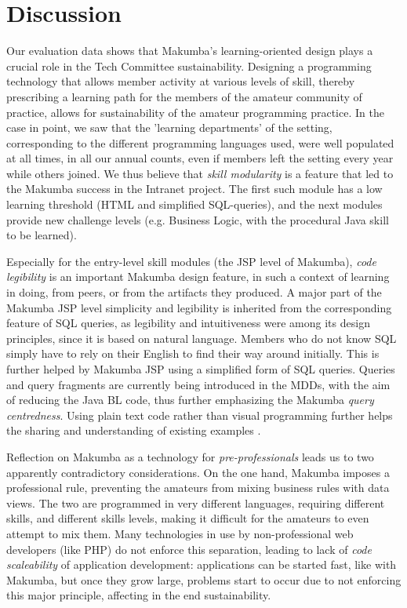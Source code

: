 \documentclass{llncs}
\begin{document}
\section{Discussion}\label{sec:disco}
Our evaluation data shows that Makumba's learning-oriented design  plays a crucial role in the Tech Committee sustainability. Designing a programming technology that allows member activity at various levels of skill, thereby prescribing a learning path for the members of the amateur community of practice, allows for sustainability of the amateur programming practice. In the case in point, we saw that the 'learning departments' of the setting, corresponding to the different programming languages used, were well populated at all times, in all our annual counts,  even if members left the setting every year while others joined. We thus believe that \textit{skill modularity} is a feature that led to the Makumba success in the Intranet project. The first such module has a low learning threshold (HTML and simplified SQL-queries), and the next modules provide new challenge levels (e.g. Business Logic, with the procedural Java skill to be learned).

Especially for the entry-level skill modules (the JSP level of Makumba), \textit{code legibility} is an important Makumba design feature, in such a context of learning in doing, from peers, or from the artifacts they produced. 
A major part of the Makumba JSP level simplicity and legibility is inherited from the corresponding feature of SQL queries, as legibility and intuitiveness were among its design principles, since it is based on natural language. Members who do not know SQL simply have to rely on their English to find their way around initially. This is further helped by Makumba JSP using a simplified form of SQL queries. Queries and query fragments are currently being introduced in the MDDs, with the aim of reducing the Java BL code, thus further emphasizing the Makumba \textit{query centredness}. Using plain text code rather than visual programming further helps the sharing and understanding of existing examples \cite{yamauchi00}. 

Reflection on Makumba as a technology for \textit{pre-professionals} \cite{stebbins79} leads us to two apparently contradictory considerations. On the one hand, Makumba imposes a professional rule, preventing the amateurs from mixing business rules with data views.  The two are programmed in very different languages, requiring different skills, and different skills levels, making  it difficult for the amateurs to even attempt to mix them. Many technologies in use by non-professional web developers (like PHP) do not enforce this separation, leading to lack of \textit{code scaleability} of application development: applications can be started fast, like with Makumba, but once they grow large, problems start to occur due to not enforcing this major principle, affecting in the end sustainability. 
\end{document}
